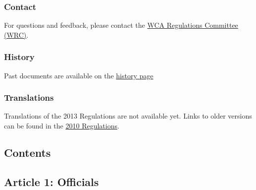 \subsubsection{Contact}

For questions and feedback, please contact the
\href{http://www.worldcubeassociation.org/contact-information}{WCA
Regulations Committee (WRC)}.

\subsubsection{History}

Past documents are available on the \href{history.html}{history page}

\subsubsection{Translations}

Translations of the 2013 Regulations are not available yet. Links to
older versions can be found in the \href{regulations2010new.html}{2010
Regulations}.

\subsection{Contents}

\subsection{ Article 1: Officials}

